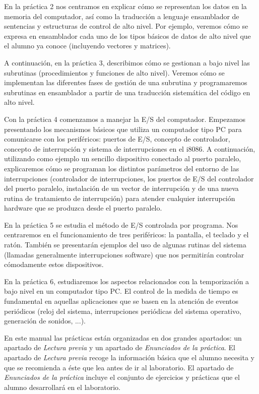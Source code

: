 En la práctica 2 nos centramos en explicar cómo se representan los
datos en la memoria del computador, así como la traducción a lenguaje
ensamblador de sentencias y estructuras de control de alto nivel. Por
ejemplo, veremos cómo se expresa en ensamblador cada uno de los tipos básicos
de datos de alto nivel que el alumno ya conoce (incluyendo vectores y
matrices).
                            
A continuación, en la práctica 3, describimos cómo se gestionan a bajo
nivel las subrutinas (procedimientos y funciones de alto
nivel). Veremos cómo se implementan las diferentes fases de gestión de
una subrutina y programaremos subrutinas en ensamblador a partir de
una traducción sistemática del código en alto nivel.

Con la práctica 4 comenzamos a manejar la E/S del computador.
Empezamos presentando los mecanismos básicos que utiliza un computador
tipo PC para comunicarse con los periféricos: puertos de E/S, concepto
de controlador, concepto de interrupción y sistema de interrupciones
en el i8086. A continuación, utilizando como ejemplo un sencillo dispositivo
conectado al puerto paralelo,
explicaremos cómo se programan los distintos parámetros del entorno de
las interrupciones (controlador de interrupciones, los puertos de E/S
del controlador del puerto paralelo, instalación de un vector de
interrupción y de una nueva rutina de tratamiento de interrupción)
para atender cualquier interrupción hardware que se produzca desde el
puerto paralelo.

 
En la práctica 5 se estudia el método de E/S controlada por programa.
Nos centraremos en el funcionamiento de tres periféricos: la pantalla,
el teclado y el ratón. También se presentarán ejemplos del uso de algunas
rutinas del sistema (llamadas generalmente interrupciones software) que
nos permitirán controlar cómodamente estos dispositivos.
 
En la práctica 6, estudiaremos los aspectos relacionados con la
temporización a bajo nivel en un computador tipo PC. El control de la
medida de tiempo es fundamental en aquellas aplicaciones que se basen
en la atención de eventos periódicos (reloj del sistema,
interrupciones periódicas del sistema operativo, generación de
sonidos, ...).

En este manual las prácticas están organizadas en dos grandes
apartados: un apartado de {\it Lectura previa} y un apartado de {\it
  Enunciados de la práctica}. El apartado de {\it Lectura previa} recoge
la información básica que el alumno necesita y que se recomienda a
éste que lea antes de ir al laboratorio. El apartado de {\it
  Enunciados de la práctica} incluye el conjunto de ejercicios y
prácticas que el alumno desarrollará en el laboratorio.

